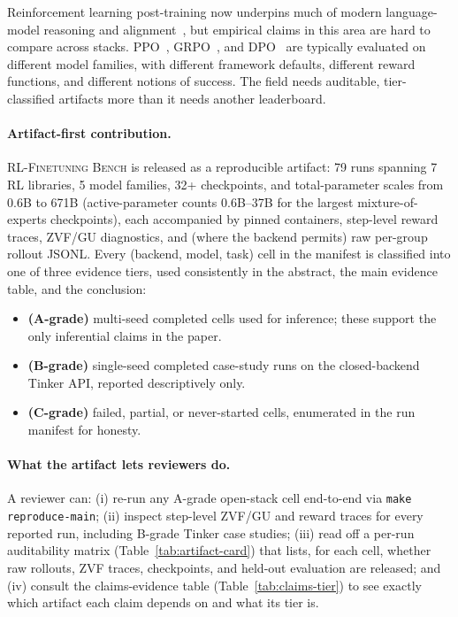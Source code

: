 \documentclass{article}
\newcommand{\ours}{\textsc{RL-Finetuning Bench}}
\begin{document}
Reinforcement learning post-training now underpins much of modern
language-model reasoning and alignment~\citep{ouyang2022training,guo2025deepseekr1nature}, but empirical claims in this area are hard to
compare across stacks. PPO~\citep{schulman2017proximal},
GRPO~\citep{shao2024deepseekmath}, and DPO~\citep{rafailov2024direct} are
typically evaluated on different model families, with different framework
defaults, different reward functions, and different notions of success. The
field needs auditable, tier-classified artifacts more than it needs another
leaderboard.

\paragraph{Artifact-first contribution.}
\ours{} is released as a reproducible artifact: 79 runs spanning 7 RL
libraries, 5 model families, 32+ checkpoints, and total-parameter scales
from 0.6B to 671B (active-parameter counts 0.6B--37B for the largest
mixture-of-experts checkpoints), each accompanied by pinned containers,
step-level reward traces, ZVF/GU diagnostics, and (where the backend
permits) raw per-group rollout JSONL. Every (backend, model, task) cell
in the manifest is classified into one of three evidence tiers, used
consistently in the abstract, the main evidence table, and the
conclusion:
\begin{itemize}\setlength\itemsep{1pt}
  \item \textbf{(A-grade)} multi-seed completed cells used for inference;
        these support the only inferential claims in the paper.
  \item \textbf{(B-grade)} single-seed completed case-study runs on the
        closed-backend Tinker API, reported descriptively only.
  \item \textbf{(C-grade)} failed, partial, or never-started cells,
        enumerated in the run manifest for honesty.
\end{itemize}

\paragraph{What the artifact lets reviewers do.}
A reviewer can: (i) re-run any A-grade open-stack cell end-to-end via
\texttt{make reproduce-main}; (ii) inspect step-level ZVF/GU and reward
traces for every reported run, including B-grade Tinker case studies;
(iii) read off a per-run auditability matrix (Table~\ref{tab:artifact-card})
that lists, for each cell, whether raw rollouts, ZVF traces, checkpoints,
and held-out evaluation are released; and (iv) consult the claims-evidence
table (Table~\ref{tab:claims-tier}) to see exactly which artifact each
claim depends on and what its tier is.
\end{document}
